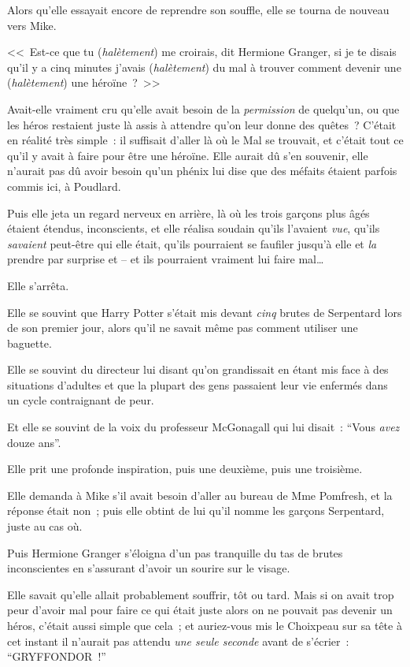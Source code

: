 Alors qu'elle essayait encore de reprendre son souffle, elle se tourna de nouveau vers Mike.

<<~Est-ce que tu (\emph{halètement}) me croirais, dit Hermione Granger, si je te disais qu'il y a cinq minutes j'avais (\emph{halètement}) du mal à trouver comment devenir une (\emph{halètement}) une héroïne~?~>>

Avait-elle vraiment cru qu'elle avait besoin de la \emph{permission} de quelqu'un, ou que les héros restaient juste là assis à attendre qu'on leur donne des quêtes~? C'était en réalité très simple~: il suffisait d'aller là où le Mal se trouvait, et c'était tout ce qu'il y avait à faire pour être une héroïne. Elle aurait dû s'en souvenir, elle n'aurait pas dû avoir besoin qu'un phénix lui dise que des méfaits étaient parfois commis ici, à Poudlard.

Puis elle jeta un regard nerveux en arrière, là où les trois garçons plus âgés étaient étendus, inconscients, et elle réalisa soudain qu'ils l'avaient \emph{vue}, qu'ils \emph{savaient} peut-être qui elle était, qu'ils pourraient se faufiler jusqu'à elle et \emph{la} prendre par surprise et -- et ils pourraient vraiment lui faire mal…

Elle s'arrêta.

Elle se souvint que Harry Potter s'était mis devant \emph{cinq} brutes de Serpentard lors de son premier jour, alors qu'il ne savait même pas comment utiliser une baguette.

Elle se souvint du directeur lui disant qu'on grandissait en étant mis face à des situations d'adultes et que la plupart des gens passaient leur vie enfermés dans un cycle contraignant de peur.

Et elle se souvint de la voix du professeur McGonagall qui lui disait~: “Vous \emph{avez} douze ans”.

Elle prit une profonde inspiration, puis une deuxième, puis une troisième.

Elle demanda à Mike s'il avait besoin d'aller au bureau de Mme Pomfresh, et la réponse était non~; puis elle obtint de lui qu'il nomme les garçons Serpentard, juste au cas où.

Puis Hermione Granger s'éloigna d'un pas tranquille du tas de brutes inconscientes en s'assurant d'avoir un sourire sur le visage.

Elle savait qu'elle allait probablement souffrir, tôt ou tard. Mais si on avait trop peur d'avoir mal pour faire ce qui était juste alors on ne pouvait pas devenir un héros, c'était aussi simple que cela~; et auriez-vous mis le Choixpeau sur sa tête à cet instant il n'aurait pas attendu \emph{une seule seconde} avant de s'écrier~: “GRYFFONDOR~!”

